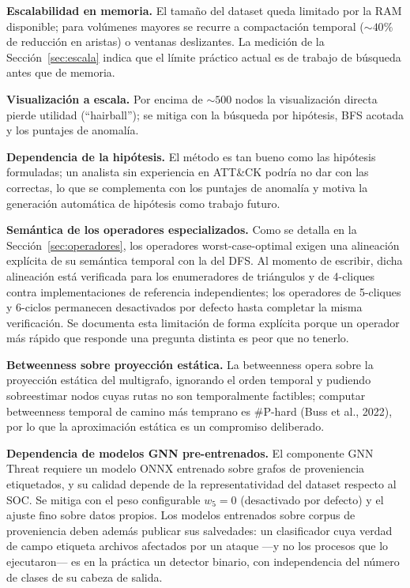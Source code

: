\documentclass[11pt,a4paper]{article}
\begin{document}
\textbf{Escalabilidad en memoria.} El tamaño del dataset queda limitado por la
RAM disponible; para volúmenes mayores se recurre a compactación temporal
(${\sim}40\%$ de reducción en aristas) o ventanas deslizantes. La medición de
la Sección~\ref{sec:escala} indica que el límite práctico actual es de trabajo
de búsqueda antes que de memoria.

\textbf{Visualización a escala.} Por encima de ${\sim}500$ nodos la
visualización directa pierde utilidad (``hairball''); se mitiga con la búsqueda
por hipótesis, BFS acotada y los puntajes de anomalía.

\textbf{Dependencia de la hipótesis.} El método es tan bueno como las hipótesis
formuladas; un analista sin experiencia en ATT\&CK podría no dar con las
correctas, lo que se complementa con los puntajes de anomalía y motiva la
generación automática de hipótesis como trabajo futuro.

\textbf{Semántica de los operadores especializados.} Como se detalla en la
Sección~\ref{sec:operadores}, los operadores worst-case-optimal exigen una
alineación explícita de su semántica temporal con la del DFS. Al momento de
escribir, dicha alineación está verificada para los enumeradores de triángulos
y de 4-cliques contra implementaciones de referencia independientes; los
operadores de 5-cliques y 6-ciclos permanecen desactivados por defecto hasta
completar la misma verificación. Se documenta esta limitación de forma
explícita porque un operador más rápido que responde una pregunta distinta es
peor que no tenerlo.

\textbf{Betweenness sobre proyección estática.} La betweenness opera sobre la
proyección estática del multigrafo, ignorando el orden temporal y pudiendo
sobreestimar nodos cuyas rutas no son temporalmente factibles; computar
betweenness temporal de camino más temprano es \#P-hard (Buss et al., 2022),
por lo que la aproximación estática es un compromiso deliberado.

\textbf{Dependencia de modelos GNN pre-entrenados.} El componente GNN Threat
requiere un modelo ONNX entrenado sobre grafos de proveniencia etiquetados, y
su calidad depende de la representatividad del dataset respecto al SOC. Se
mitiga con el peso configurable $w_5 = 0$ (desactivado por defecto) y el ajuste
fino sobre datos propios. Los modelos entrenados sobre corpus de proveniencia
deben además publicar sus salvedades: un clasificador cuya verdad de campo
etiqueta archivos afectados por un ataque ---y no los procesos que lo
ejecutaron--- es en la práctica un detector binario, con independencia del
número de clases de su cabeza de salida.
\end{document}
